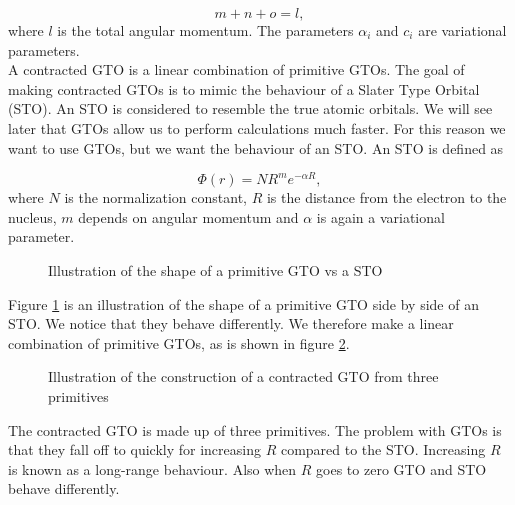 \documentclass[a4paper,norsk,11pt,twoside]{report}
\begin{document}
\begin{equation}
m + n + o = l , 
\end{equation}
where $l$ is the total angular momentum. The parameters $\alpha_i$ and $c_i$ are variational parameters. \\

A contracted GTO is a linear combination of primitive GTOs. The goal
of making contracted GTOs is to mimic the behaviour of a Slater Type
Orbital (STO). An STO is considered to resemble the true atomic
orbitals. We will see later that GTOs allow us to perform
calculations much faster. For this reason we want to use GTOs, but we
want the behaviour of an STO. An STO is defined as

\begin{equation}
\Phi(r) = N R^m e^{-\alpha R} ,
\end{equation}
where $N$ is the normalization constant, $R$ is the distance from the
electron to the nucleus, $m$ depends on angular momentum and $\alpha$
is again a variational parameter. \\

\begin{figure}[h!]
\begin{center}
\caption{Illustration of the shape of a primitive GTO vs a STO}
\label{fig:STOvsGTO1}
\end{center}
\end{figure}

Figure \ref{fig:STOvsGTO1} is an illustration of the shape of a
primitive GTO side by side of an STO. We notice that they behave differently. We therefore make a linear combination of
primitive GTOs, as is shown in figure \ref{fig:STOvsGTO2}. \\

\begin{figure}[h!]
\begin{center}
\caption{Illustration of the construction of a contracted GTO from three primitives}
\label{fig:STOvsGTO2}
\end{center}
\end{figure}

The contracted GTO is made up of three primitives. The problem with
GTOs is that they fall off to quickly for increasing $R$ compared  to
the STO. Increasing $R$ is known as a long-range behaviour. Also when $R$
goes to zero GTO and STO behave differently. \\
\end{document}
